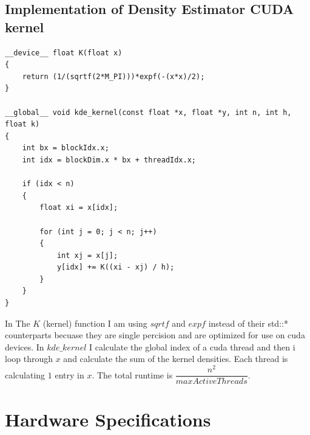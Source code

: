 \documentclass[11pt,a4paper]{article}
\begin{document}
\subsection{Implementation of Density Estimator CUDA kernel}
\begin{lstlisting}
__device__ float K(float x)
{
    return (1/(sqrtf(2*M_PI)))*expf(-(x*x)/2);
}

__global__ void kde_kernel(const float *x, float *y, int n, int h, float k)
{
    int bx = blockIdx.x;
    int idx = blockDim.x * bx + threadIdx.x;

    if (idx < n)
    {
        float xi = x[idx];

        for (int j = 0; j < n; j++)
        {
            int xj = x[j];
            y[idx] += K((xi - xj) / h);
        }
    }
}
\end{lstlisting}
In The $K$ (kernel) function I am using $sqrtf$ and $expf$ instead of their std::* counterparts becuase they are single percision and are optimized for use on cuda devices. In $kde\_kernel$ I calculate the global index of a cuda thread and then i loop through $x$ and calculate the sum of the kernel densities. Each thread is calculating $1$ entry in $x$. The total runtime is $\dfrac{n^2}{maxActiveThreads}$.


\section{Hardware Specifications}
\end{document}
